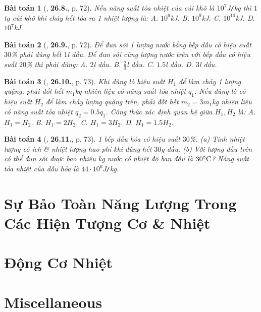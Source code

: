 \documentclass{article}
\numberwithin{equation}{section}
\newtheorem{baitoan}{Bài toán}
\begin{document}
\begin{baitoan}[\cite{SBT_Vat_Ly_8}, \textbf{26.8.}, p. 72]
	Nếu năng suất tỏa nhiệt của củi khô là $10^7$\emph{J\texttt{/}kg} thì $1$ tạ củi khô khi cháy hết tỏa ra 1 nhiệt lượng là: {\sf A.} $10^6$\emph{kJ}. {\sf B.} $10^9$\emph{kJ}. {\sf C.} $10^{10}$\emph{kJ}. {\sf D.} $10^7$\emph{kJ}.
\end{baitoan}

\begin{baitoan}[\cite{SBT_Vat_Ly_8}, \textbf{26.9.}, p. 72]
	Để đun sôi 1 lượng nước bằng bếp dầu có hiệu suất $30$\% phải dùng hết $1$\emph{l} dầu. Để đun sôi cũng lượng nước trên với bếp dầu có hiệu suất $20$\% thì phải dùng: {\sf A.} $2$\emph{l} dầu. {\sf B.} $\frac{2}{3}$\emph{l} dầu. {\sf C.} $1.5$\emph{l} dầu. {\sf D.} $3$\emph{l} dầu.
\end{baitoan}

\begin{baitoan}[\cite{SBT_Vat_Ly_8}, \textbf{26.10.}, p. 73]
	Khi dùng lò hiệu suất $H_1$ để làm chảy 1 lượng quặng, phải đốt hết $m_1$\emph{kg} nhiên liệu có năng suất tỏa nhiệt $q_1$. Nếu dùng lò có hiệu suất $H_2$ để làm chảy lượng quặng trên, phải đốt hết $m_2 = 3m_1$\emph{kg} nhiên liệu có năng suất tỏa nhiệt $q_2 = 0.5q_1$. Công thức xác định quan hệ giữa $H_1,H_2$ là: {\sf A.} $H_1 = H_2$. {\sf B.} $H_1 = 2H_2$. {\sf C.} $H_1 = 3H_2$. {\sf D.} $H_1 = 1.5H_2$.
\end{baitoan}

\begin{baitoan}[\cite{SBT_Vat_Ly_8}, \textbf{26.11.}, p. 73]
	1 bếp dầu hỏa có hiệu suất $30$\%. (a) Tính nhiệt lượng có ích \& nhiệt lượng hao phí khi dùng hết $30$\emph{g} dầu. (b) Với lượng dầu trên có thể đun sôi được bao nhiêu \emph{kg} nước có nhiệt độ ban đầu là $30^\circ{\rm C}$? Năng suất tỏa nhiệt của dầu hỏa là $44\cdot10^6$\emph{J\texttt{/}kg}.
\end{baitoan}


\section{Sự Bảo Toàn Năng Lượng Trong Các Hiện Tượng Cơ \& Nhiệt}


\section{Động Cơ Nhiệt}


\section{Miscellaneous}


\printbibliography[heading=bibintoc]
	
\end{document}
